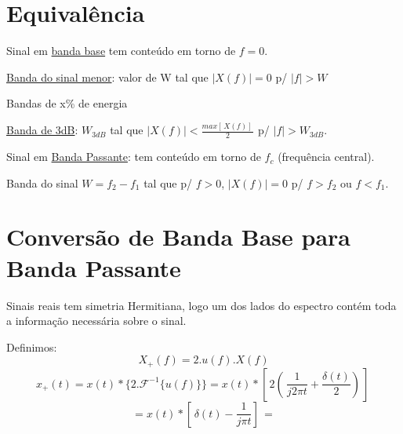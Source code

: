 \documentclass[12pt]{book}
\begin{document}
\section{Equivalência}

Sinal em \underline{banda base} tem conteúdo em torno de $f=0$.

\underline{Banda do sinal menor}: valor de W tal que \( |X(f)|=0\) p/ \(|f|>W \)

Bandas de x\% de energia

\underline{Banda de 3dB}: \( W_{3dB} \) tal que \( |X(f)|< \frac{max[\,X(f)]\,}{2} \)  p/ \( |f| > W_{3dB} \).

Sinal em \underline{Banda Passante}: tem conteúdo em torno de $f_c$ (frequência central).

Banda do sinal $W=f_2 - f_1$ tal que p/ $f>0$, $|X(f)|=0$ p/ $f>f_2$ ou $f<f_1$.

\section{Conversão de Banda Base para Banda Passante}

Sinais reais tem simetria Hermitiana, logo um dos lados do espectro contém toda a informação necessária sobre o sinal.

Definimos: 
\begin{equation}
X_+ (f)=2.u(f).X(f)
\end{equation}
\begin{equation}
x_+ (t) = x(t)*\{2.\mathcal{F}^{-1}\{u(f)\}\} = x(t)*[\, 2(\, \frac{1}{j2\pi t} + \frac{\delta (t)}{2} )\, ]\,
\end{equation}
\begin{equation}
= x(t)*[\, \delta (t) - \frac{1}{j \pi t} ]\, = 
\end{equation}
\end{document}
